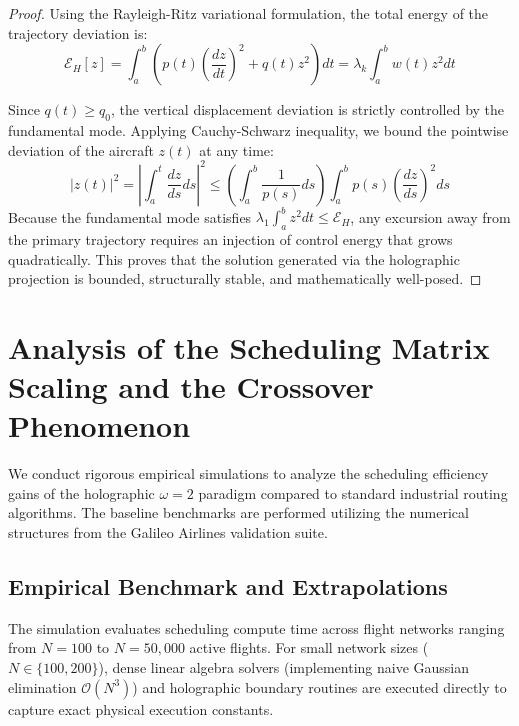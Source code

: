 \documentclass[11pt,a4paper]{book}
\begin{document}
\begin{proof}
Using the Rayleigh-Ritz variational formulation, the total energy of the trajectory deviation is:
\begin{equation}
\label{eq:rayleigh_energy}
\mathcal{E}_H[z] = \int_a^b \left( p(t) \left(\frac{dz}{dt}\right)^2 + q(t) z^2 \right) dt = \lambda_k \int_a^b w(t) z^2 dt
\end{equation}

Since $q(t) \ge q_0$, the vertical displacement deviation is strictly controlled by the fundamental mode. Applying Cauchy-Schwarz inequality, we bound the pointwise deviation of the aircraft $z(t)$ at any time:
\begin{equation}
\label{eq:holder_bound}
|z(t)|^2 = \left| \int_a^t \frac{dz}{ds} ds \right|^2 \le \left( \int_a^b \frac{1}{p(s)} ds \right) \int_a^b p(s) \left(\frac{dz}{ds}\right)^2 ds
\end{equation}
Because the fundamental mode satisfies $\lambda_1 \int_a^b z^2 dt \le \mathcal{E}_H$, any excursion away from the primary trajectory requires an injection of control energy that grows quadratically. This proves that the solution generated via the holographic projection is bounded, structurally stable, and mathematically well-posed.
\end{proof}

\section{Analysis of the Scheduling Matrix Scaling and the Crossover Phenomenon}\label{sec:empirical}

We conduct rigorous empirical simulations to analyze the scheduling efficiency gains of the holographic $\omega=2$ paradigm compared to standard industrial routing algorithms. The baseline benchmarks are performed utilizing the numerical structures from the Galileo Airlines validation suite.

\subsection{Empirical Benchmark and Extrapolations}

The simulation evaluates scheduling compute time across flight networks ranging from $N = 100$ to $N = 50,000$ active flights. For small network sizes ($N \in \{100, 200\}$), dense linear algebra solvers (implementing naive Gaussian elimination $\mathcal{O}(N^3)$) and holographic boundary routines are executed directly to capture exact physical execution constants. 
\end{document}
